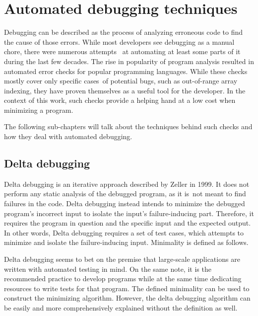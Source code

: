 \chapter{Automated debugging techniques}

\lipsum[11]

Debugging can be described as the process of analyzing erroneous code to find 
the cause of those errors.
While most developers see debugging as a manual chore, there were numerous 
attempts~ at automating at least some parts of it during the last few decades. 
The rise in popularity of program analysis resulted in automated error checks 
for popular programming languages. While these checks mostly cover only specific 
cases~of potential bugs, such as out-of-range array indexing, they have proven 
themselves as a useful tool for the developer. In the context of this work, 
such checks provide a helping hand at a low cost when minimizing a program. 

The following sub-chapters will talk about the techniques behind such checks 
and how they deal with automated debugging.

\section{Delta debugging}

Delta debugging is an iterative approach described by Zeller in 1999. 
It does not perform any static analysis of the debugged program, as it 
is~not meant to find failures in the code. Delta debugging instead intends to 
minimize the debugged program's incorrect input to isolate the input's 
failure-inducing part. 
Therefore, it requires the program in question and the specific input 
and the expected output. 
In other words, Delta debugging requires a set of test cases, which attempts to 
minimize and isolate the failure-inducing input. Minimality is defined as follows.

\lipsum[11]

Delta debugging seems to bet on the premise that large-scale applications are written
with automated testing in mind. On the same note, it is the recommended practice to
develop programs while at the same time dedicating resources to write tests for that
program.
The defined minimality can be used to construct the minimizing algorithm. 
However, the delta debugging algorithm can be easily and more comprehensively explained 
without the definition as well.

